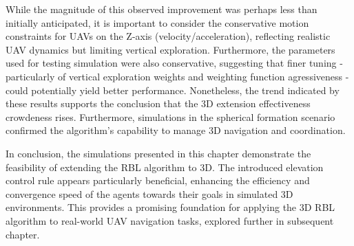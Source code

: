         While the magnitude of this observed improvement was perhaps less than initially anticipated, it is important to consider the conservative motion constraints for \ac{UAV}s on the Z-axis (velocity/acceleration), reflecting realistic \ac{UAV} dynamics but limiting vertical exploration.
        Furthermore, the parameters used for testing simulation were also conservative, suggesting that finer tuning - particularly of vertical exploration weights and weighting function agressiveness - could potentially yield better performance.
        Nonetheless, the trend indicated by these results supports the conclusion that the 3D extension effectiveness crowdeness rises.
        Furthermore, simulations in the spherical formation scenario confirmed the algorithm's capability to manage 3D navigation and coordination.

        In conclusion, the simulations presented in this chapter demonstrate the feasibility of extending the RBL algorithm to 3D. 
        The introduced elevation control rule appears particularly beneficial, enhancing the efficiency and convergence speed of the agents towards their goals in simulated 3D environments. 
        This provides a promising foundation for applying the 3D RBL algorithm to real-world UAV navigation tasks, explored further in subsequent chapter.
    
